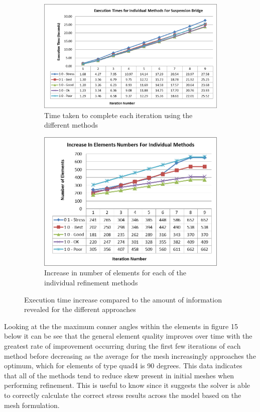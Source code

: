\begin{figure}[H]
\centering
\begin{subfigure}{.5\textwidth}
  \centering
  \includegraphics[width=0.9\linewidth]{../Graphics/Graphs/SingleMethods/ExecutionTimes.png}
  \caption{Time taken to complete each iteration using the different methods}
  \label{fig:sub1}
\end{subfigure}%
\begin{subfigure}{.5\textwidth}
  \centering
  \includegraphics[width=0.75\linewidth]{../Graphics/Graphs/SingleMethods/NumberOfElements.png}
  \caption{Increase in number of elements for each of the individual refinement methods}
  \label{fig:sub2}
\end{subfigure}
\label{fig:test}
  \caption{Execution time increase compared to the amount of information revealed for the different approaches}
 \end{figure}
 
\noindent
Looking at the the maximum conner angles within the elements in figure 15 below it can be see that the general element quality improves over time with the greatest rate of improvement occurring during the first few iterations of each method before decreasing as the average for the mesh increasingly approaches the optimum, which for elements of type  quad4 is 90 degrees. This data indicates that all of the methods tend to reduce skew present in initial meshes when performing refinement. This is useful to know since it suggests the solver is able to correctly calculate the correct stress results across the model based on the mesh formulation. \\ 


